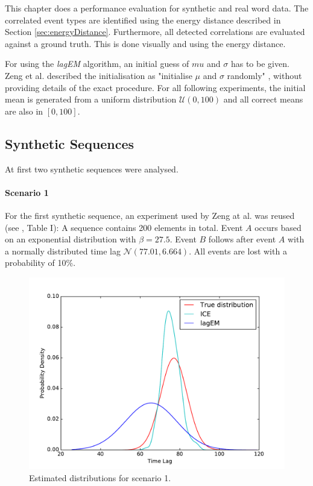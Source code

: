 \documentclass[conference]{IEEEtran}
\theoremstyle{examplestyle}
\begin{document}
This chapter does a performance evaluation for synthetic and real word data. The correlated event types are identified using the energy distance described in Section \ref{sec:energyDistance}. Furthermore, all detected correlations are evaluated against a ground truth. This is done visually and using the energy distance.

For using the \textit{lagEM} algorithm, an initial guess of \(mu\) and \(\sigma\) has to be given. Zeng et al. described the initialisation as "initialise \(\mu\) and \(\sigma\) randomly" \cite{Zeng2015}, without providing details of the exact procedure. For all following experiments, the initial mean is generated from a uniform distribution \(\mathcal{U}(0, 100)\) and all correct means are also in \([0, 100]\).





\subsection{Synthetic Sequences}

At first two synthetic sequences were analysed. 


\paragraph{Scenario 1}
For the first synthetic sequence, an experiment used by Zeng at al. was reused (see \cite{Zeng2015}, Table I): A sequence contains 200 elements in total. Event \(A\) occurs based on an exponential distribution with \(\beta = 27.5\). Event \(B\) follows after event \(A\) with a normally distributed time lag \(\mathcal{N}(77.01, 6.664)\). All events are lost with a probability of 10\%.


\begin{figure}[!htb]
	\centering
	\includegraphics[scale=0.4]{images/scenarios/1.pdf}
	\caption{Estimated distributions for scenario 1.}
	\label{fig:scen1}
\end{figure}
\end{document}
